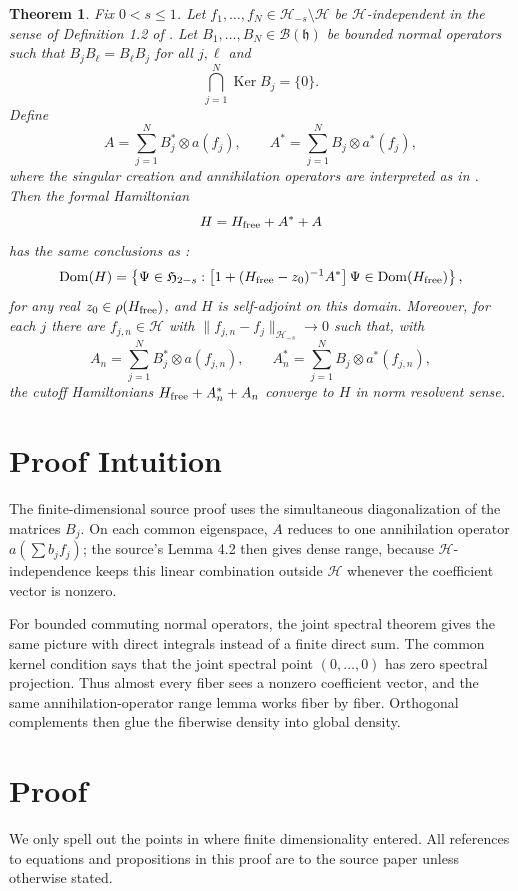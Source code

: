 \documentclass[11pt]{article}
\newtheorem{theorem}{Theorem}
\newcommand{\hhilb}{\mathfrak h}
\newcommand{\HH}{\mathcal H}
\newcommand{\G}{\mathfrak H}
\newcommand{\dom}{\operatorname{Dom}}
\newcommand{\kerop}{\operatorname{Ker}}
\begin{document}
\begin{theorem}
Fix $0<s\le 1$. Let $f_1,\ldots,f_N\in \HH_{-s}\setminus\HH$ be
$\HH$-independent in the sense of Definition 1.2 of \cite{LL}. Let
$B_1,\ldots,B_N\in\mathcal B(\hhilb)$ be bounded normal operators such that
$B_jB_\ell=B_\ell B_j$ for all $j,\ell$ and
\[
\bigcap_{j=1}^N \kerop B_j=\{0\}.
\]
Define
\[
A=\sum_{j=1}^N B_j^*\otimes a(f_j),\qquad
A^*=\sum_{j=1}^N B_j\otimes a^*(f_j),
\]
where the singular creation and annihilation operators are interpreted as in
\cite[Proposition 4.1]{LL}. Then the formal Hamiltonian
\[
H=H_{\rm free}+A^*+A
\]
has the same conclusions as \cite[Theorem 1.3]{LL}:
\[
\dom(H)=
\left\{\Psi\in\G_{2-s}:
\left[1+(H_{\rm free}-z_0)^{-1}A^*\right]\Psi\in\dom(H_{\rm free})\right\},
\]
for any real $z_0\in\rho(H_{\rm free})$, and $H$ is self-adjoint on this domain.
Moreover, for each $j$ there are $f_{j,n}\in\HH$ with
$\|f_{j,n}-f_j\|_{\HH_{-s}}\to0$ such that, with
\[
A_n=\sum_{j=1}^N B_j^*\otimes a(f_{j,n}),\qquad
A_n^*=\sum_{j=1}^N B_j\otimes a^*(f_{j,n}),
\]
the cutoff Hamiltonians $H_{\rm free}+A_n^*+A_n$ converge to $H$ in norm
resolvent sense.
\end{theorem}

\section*{Proof Intuition}

The finite-dimensional source proof uses the simultaneous diagonalization of
the matrices $B_j$. On each common eigenspace, $A$ reduces to one annihilation
operator $a(\sum b_jf_j)$; the source's Lemma 4.2 then gives dense range,
because $\HH$-independence keeps this linear combination outside $\HH$ whenever
the coefficient vector is nonzero.

For bounded commuting normal operators, the joint spectral theorem gives the
same picture with direct integrals instead of a finite direct sum. The common
kernel condition says that the joint spectral point $(0,\ldots,0)$ has zero
spectral projection. Thus almost every fiber sees a nonzero coefficient vector,
and the same annihilation-operator range lemma works fiber by fiber. Orthogonal
complements then glue the fiberwise density into global density.

\section*{Proof}

We only spell out the points in \cite{LL} where finite dimensionality entered.
All references to equations and propositions in this proof are to the source
paper unless otherwise stated.
\end{document}
